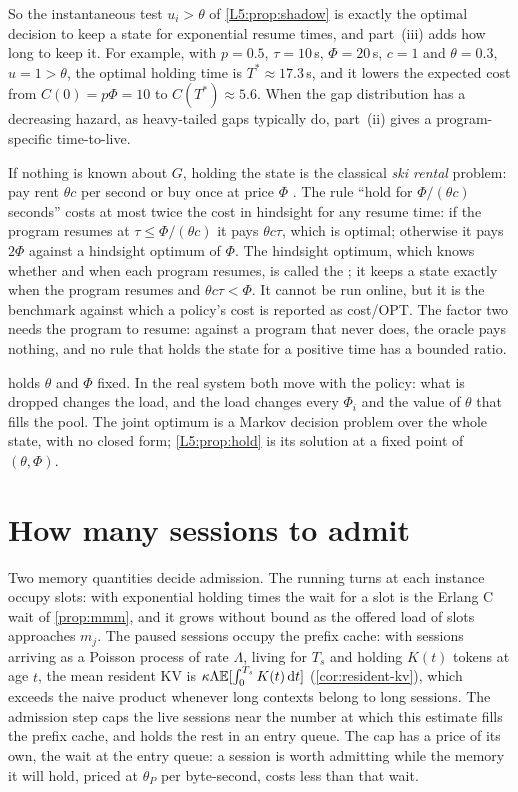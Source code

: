 So the instantaneous test $u_i>\theta$ of \cref{L5:prop:shadow} is exactly the optimal
decision to keep a state for exponential resume times, and part~(iii) adds how long to keep it.
For example, with $p=0.5$, $\tau=10$\,s, $\Phi=20$\,s, $c=1$ and $\theta=0.3$, $u=1>\theta$,
the optimal holding time is $T^*\approx17.3$\,s, and it lowers the expected cost from
$C(0)=p\Phi=10$ to $C(T^*)\approx5.6$. When the gap distribution has a decreasing hazard, as
heavy-tailed gaps typically do, part~(ii) gives a program-specific time-to-live.

\begin{remark}\label{L5:rem:ski}
If nothing is known about $G$, holding the state is the classical \emph{ski rental}
problem: pay rent $\theta c$ per second or buy once at price $\Phi$
\cite{karlin1988}. The rule ``hold for $\Phi/(\theta c)$ seconds'' costs at most twice
the cost in hindsight for any resume time: if the program resumes at
$\tau\le\Phi/(\theta c)$ it pays $\theta c\tau$, which is optimal; otherwise it pays
$2\Phi$ against a hindsight optimum of $\Phi$. The hindsight optimum, which knows
whether and when each program resumes, is called the ; it keeps a state
exactly when the program resumes and $\theta c\tau<\Phi$. It cannot be run online, but
it is the benchmark against which a policy's cost is reported as cost/OPT. The factor
two needs the program to resume: against a program that never does, the oracle pays
nothing, and no rule that holds the state for a positive time has a bounded ratio.
\end{remark}

 holds $\theta$ and $\Phi$ fixed. In the real system both move with
the policy: what is dropped changes the load, and the load changes every $\Phi_i$ and
the value of $\theta$ that fills the pool. The joint optimum is a Markov decision problem
over the whole state, with no closed form; \cref{L5:prop:hold} is its solution at a
fixed point of $(\theta,\Phi)$.

\section{How many sessions to admit}\label{L5:sec:admit}

Two memory quantities decide admission. The running turns at each instance occupy slots:
with exponential holding times the wait for a slot is the Erlang C wait of
\cref{prop:mmm}, and it grows without bound as the offered load of slots approaches
$m_j$. The paused sessions occupy the prefix cache: with sessions arriving as a Poisson
process of rate $\Lambda$, living for $T_s$ and holding $K(t)$ tokens at age $t$, the mean
resident KV is $\kappa\Lambda\mathbb{E}[\int_0^{T_s}K(t)\,\mathrm{d} t]$ (\cref{cor:resident-kv}), which
exceeds the naive product whenever long contexts belong to long sessions. The admission
step caps the live sessions near the number at which this estimate fills the prefix
cache, and holds the rest in an entry queue. The cap has a price of its own, the wait at
the entry queue: a session is worth admitting while the memory it will hold, priced at
$\theta_P$ per byte-second, costs less than that wait.

